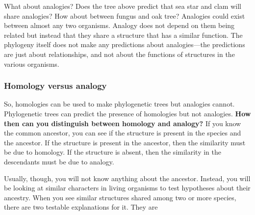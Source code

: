 \documentclass[12pt, hidelinks]{exam}
\begin{document}
\bigskip

\begin{center}


\end{center}

\bigskip

What about analogies? Does the tree above predict that sea star and clam will
share analogies? How about between fungus and oak tree? 
Analogies could exist between almost any two
organisms. Analogy does not depend on them being related but instead that they
share a structure that has a similar function. The phylogeny itself does not 
make any predictions about analogies---the predictions are just about relationships, 
and not about the functions of structures in the various organisms.

\subsubsection*{Homology versus analogy}

So, homologies can be used to make phylogenetic trees but analogies cannot. 
Phylogenetic trees can predict the presence of homologies but not analogies. 
\textbf{How then can you distinguish between homology and analogy?} If you know the 
common ancestor, you can see if the structure is present in the species and the
ancestor. If the structure is present in the ancestor, then the similarity must be due
to homology. If the structure is absent, then the similarity in the descendants must be due to analogy.

Usually, though, you will not know anything about the ancestor. Instead, you will be looking at similar characters in living organisms to test
hypotheses about their ancestry.  When 
you see similar structures shared among two or more species, there are two
testable explanations for it. They are
\end{document}
